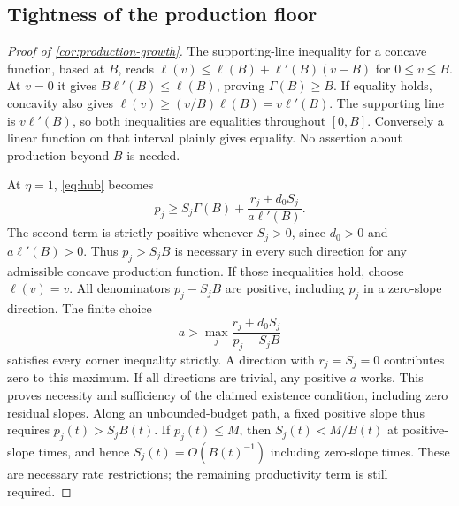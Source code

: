 \documentclass[11pt,a4paper]{article}
\theoremstyle{definition}\newtheorem{definition}{Definition}
\begin{document}
\subsection{Tightness of the production floor}
\label{app:floor-proof}
\begin{proof}[Proof of \cref{cor:production-growth}]
The supporting-line inequality for a concave function, based at $B$,
reads $\ell(v)\leq\ell(B)+\ell'(B)(v-B)$ for $0\leq v\leq B$.
At $v=0$ it gives $B\ell'(B)\leq\ell(B)$, proving $\Gamma(B)\geq B$.
If equality holds, concavity also gives
$\ell(v)\geq(v/B)\ell(B)=v\ell'(B)$. The supporting line is
$v\ell'(B)$, so both inequalities are equalities throughout $[0,B]$.
Conversely a linear function on that interval plainly gives equality.
No assertion about production beyond $B$ is needed.

At $\eta=1$, \cref{eq:hub} becomes
\[
 p_j\geq S_j\Gamma(B)+\frac{r_j+d_0S_j}{a\ell'(B)}.
\]
The second term is strictly positive whenever $S_j>0$, since $d_0>0$
and $a\ell'(B)>0$. Thus $p_j>S_jB$ is necessary in every such
direction for any admissible concave production function.
If those inequalities hold, choose $\ell(v)=v$.
All denominators $p_j-S_jB$ are positive, including $p_j$ in a
zero-slope direction. The finite choice
\[
 a>\max_j\frac{r_j+d_0S_j}{p_j-S_jB}
\]
satisfies every corner inequality strictly. A direction with
$r_j=S_j=0$ contributes zero to this maximum. If all directions are
trivial, any positive $a$ works. This proves necessity and sufficiency
of the claimed existence condition, including zero residual slopes.
Along an unbounded-budget path, a fixed positive slope thus requires
$p_j(t)>S_jB(t)$. If $p_j(t)\leq M$, then
$S_j(t)<M/B(t)$ at positive-slope times, and hence
$S_j(t)=O(B(t)^{-1})$ including zero-slope times. These are necessary
rate restrictions; the remaining productivity term is still required.
\end{proof}
\end{document}
